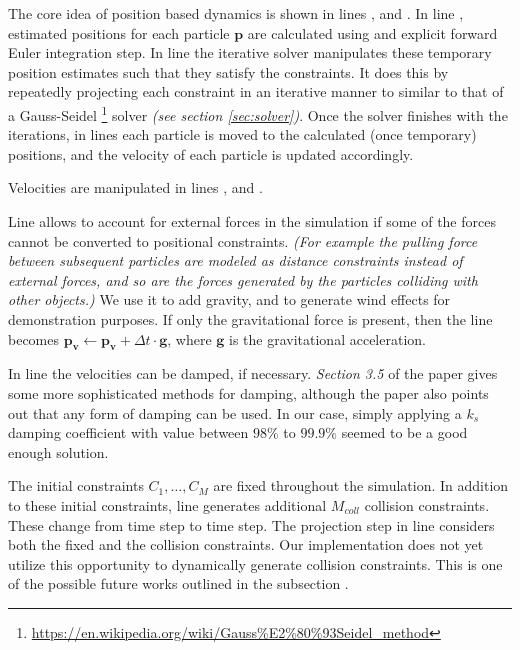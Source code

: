 \documentclass[sigplan,screen,nonacm]{acmart}
\renewcommand{\b}{\boldsymbol}
\begin{document}
The core idea of position based dynamics is shown in lines ,
 and . In line , estimated
positions for each particle $\b{p}$ are calculated using and explicit forward
Euler integration step. In line  the iterative solver manipulates
these temporary position estimates such that they satisfy the constraints. It
does this by repeatedly projecting each constraint in an iterative manner to
similar to that of a Gauss-Seidel
\footnote{\url{https://en.wikipedia.org/wiki/Gauss\%E2\%80\%93Seidel\_method}}
solver \emph{(see section \ref{sec:solver})}. Once the solver finishes with the
iterations, in lines  each particle is moved to the calculated
(once temporary) positions, and the velocity of each particle is updated
accordingly.

Velocities are manipulated in lines ,  and
. 

Line  allows to account for external forces
in the simulation if some of the forces cannot be converted to positional
constraints. \emph{(For example the pulling force between subsequent particles
are modeled as distance constraints instead of external forces, and so are the
forces generated by the particles colliding with other objects.)} We use it to
add gravity, and to generate wind effects for demonstration purposes. If only
the gravitational force is present, then the line becomes $\b{p_v} \gets \b{p_v}
+ \Delta t \cdot \b{g}$, where $\b{g}$ is the gravitational acceleration.

In line  the velocities can be damped, if necessary. \emph{Section
3.5} of the \citet{MullerPBD} paper gives some more sophisticated methods for
damping, although the paper also points out that any form of damping can be
used. In our case, simply applying a $k_s$ damping coefficient with value
between $98\%$ to $99.9\%$ seemed to be a good enough solution.

The initial constraints $C_1, \ldots, C_M$ are fixed throughout the simulation.
In addition to these initial constraints, line  generates additional
$M_{coll}$ collision constraints. These change from time step to time step. The
projection step in line  considers both the fixed and the
collision constraints. Our implementation does not yet utilize this opportunity
to dynamically generate collision constraints. This is one of the possible future
works outlined in the subsection .
\end{document}
